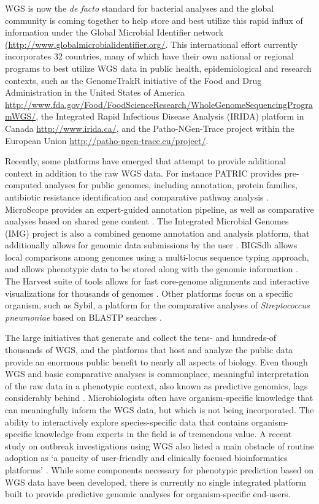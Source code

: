 \documentclass[doublespacing, linenumbers]{bmcart}
\begin{document}
  WGS is now the \textit{de facto} standard for bacterial analyses and the global community is coming together to help store and best utilize this rapid influx of information under the Global Microbial Identifier network \url{(http://www.globalmicrobialidentifier.org/}. This international effort currently incorporates 32 countries, many of which have their own national or regional programs to best utilize WGS data in public health, epidemiological and research contexts, such as the GenomeTrakR initiative of the Food and Drug Administration in the United States of America \url{http://www.fda.gov/Food/FoodScienceResearch/WholeGenomeSequencingProgramWGS/}, the Integrated Rapid Infectious Disease Analysis (IRIDA) platform in Canada \url{http://www.irida.ca/}, and the Patho-NGen-Trace project within the European Union  \url{http://patho-ngen-trace.eu/project/}.

Recently, some platforms have emerged that attempt to provide additional context in addition to the raw WGS data. For instance PATRIC provides pre-computed analyses for public genomes, including annotation, protein families, antibiotic resistance identification and comparative pathway analysis \cite{wattam_patric_2013}.   MicroScope provides an expert-guided annotation pipeline, as well as comparative analyses based on shared gene content
\cite{vallenet_microscope--integrated_2012}. The Integrated Microbial Genomes (IMG) project is also a combined genome annotation and analysis platform, that additionally allows for genomic data submissions by the user \cite{markowitz_img_2013}. BIGSdb allows local comparisons among genomes using a multi-locus sequence typing approach, and allows phenotypic data to be stored along with the genomic information \cite{jolley_bigsdb:_2010}. The Harvest suite of tools allows for fast core-genome alignments and interactive visualizations for thousands of genomes \cite{treangen_rapid_2014}. Other platforms focus on  a specific organism, such as Sybil, a platform for the comparative analyses of \textit{Streptococcus pneumoniae} based on BLASTP searches \cite{riley_using_2012}. 

The large initiatives that generate and collect the tens- and hundreds-of thousands of WGS, and the platforms that host and analyze the public data provide an enormous public benefit to nearly all aspects of biology. Even though WGS and basic comparative analyses is commonplace, meaningful interpretation of the raw data in a phenotypic context, also known as predictive genomics, lags considerably behind \cite{fricke_bacterial_2014}. Microbiologists often have organism-specific knowledge that can meaningfully inform the WGS data, but which is not being incorporated.  The ability to interactively explore species-specific data that contains organism-specific knowledge from experts in the field is of tremendous value. A recent study on outbreak investigations using WGS also listed a main obstacle of routine adoption as `a paucity of user-friendly and clinically focused bioinformatics platforms'  \cite{sherry_outbreak_2013}. While some components necessary for phenotypic prediction based on WGS data have been developed, there is currently no single integrated platform built to provide predictive genomic analyses for organism-specific end-users.
\end{document}
